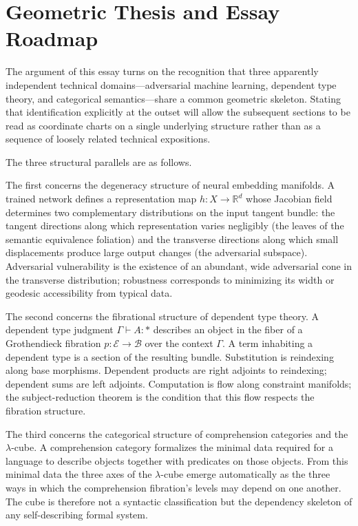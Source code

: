\documentclass[12pt,a4paper]{article}
\theoremstyle{plain}
\theoremstyle{definition}
\newcommand{\E}{\mathcal{E}}
\newcommand{\B}{\mathcal{B}}
\begin{document}
\section{Geometric Thesis and Essay Roadmap}

The argument of this essay turns on the recognition that three apparently
independent technical domains---adversarial machine learning, dependent type
theory, and categorical semantics---share a common geometric skeleton. Stating
that identification explicitly at the outset will allow the subsequent sections
to be read as coordinate charts on a single underlying structure rather than as
a sequence of loosely related technical expositions.

The three structural parallels are as follows.

The first concerns the degeneracy structure of neural embedding manifolds. A
trained network defines a representation map $h : X \to \mathbb{R}^d$ whose
Jacobian field determines two complementary distributions on the input tangent
bundle: the tangent directions along which representation varies negligibly
(the leaves of the semantic equivalence foliation) and the transverse directions
along which small displacements produce large output changes (the adversarial
subspace). Adversarial vulnerability is the existence of an abundant, wide
adversarial cone in the transverse distribution; robustness corresponds to
minimizing its width or geodesic accessibility from typical data.

The second concerns the fibrational structure of dependent type theory. A
dependent type judgment $\Gamma \vdash A : *$ describes an object in the fiber
of a Grothendieck fibration $p : \E \to \B$ over the context $\Gamma$. A term
inhabiting a dependent type is a section of the resulting bundle. Substitution
is reindexing along base morphisms. Dependent products are right adjoints to
reindexing; dependent sums are left adjoints. Computation is flow along
constraint manifolds; the subject-reduction theorem is the condition that this
flow respects the fibration structure.

The third concerns the categorical structure of comprehension categories and the
$\lambda$-cube. A comprehension category formalizes the minimal data required
for a language to describe objects together with predicates on those objects.
From this minimal data the three axes of the $\lambda$-cube emerge automatically
as the three ways in which the comprehension fibration's levels may depend on
one another. The cube is therefore not a syntactic classification but the
dependency skeleton of any self-describing formal system.
\end{document}
